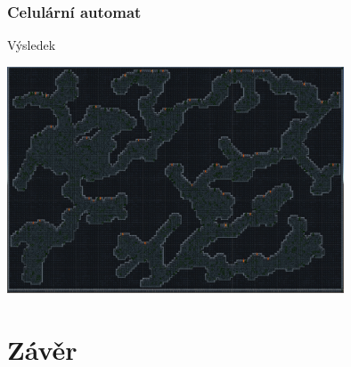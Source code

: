 \documentclass{beamer}
\begin{document}
\begin{frame}
	\frametitle{Celulární automat}
	\begin{itemize}
		\item Výsledek
		\begin{center}
			\item
			\includegraphics[width=10cm]{cave-result.png}	
		\end{center}
	\end{itemize}	
\end{frame}
\section{Závěr}
 
\end{document}
